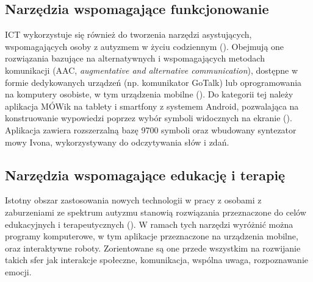     \subsection{Narzędzia wspomagające funkcjonowanie}
    ICT wykorzystuje się również do tworzenia narzędzi asystujących, wspomagających osoby z autyzmem w życiu codziennym (\cite{boucenna2014interactive}). %
    Obejmują one rozwiązania bazujące na alternatywnych i wspomagających metodach komunikacji (AAC, \emph{augmentative and alternative communication}), dostępne w formie dedykowanych urządzeń (np. komunikator GoTalk) lub oprogramowania na komputery osobiste, w tym urządzenia mobilne (\cite{shane2012applying}).
    Do kategorii tej należy aplikacja MÓWik na tablety i smartfony z systemem Android, pozwalająca na konstruowanie wypowiedzi poprzez wybór symboli widocznych na ekranie (\cite{markuc2014wspomaganie}).
    Aplikacja zawiera rozszerzalną bazę 9700 symboli oraz wbudowany syntezator mowy Ivona, wykorzystywany do odczytywania słów i zdań.
    
    \subsection{Narzędzia wspomagające edukację i terapię}
    Istotny obszar zastosowania nowych technologii w pracy z osobami z zaburzeniami ze spektrum autyzmu stanowią rozwiązania przeznaczone do celów edukacyjnych i terapeutycznych (\cite{boucenna2014interactive}).
    W ramach tych narzędzi wyróżnić można programy komputerowe, w tym aplikacje przeznaczone na urządzenia mobilne, oraz interaktywne roboty.
    Zorientowane są one przede wszystkim na rozwijanie takich sfer jak interakcje społeczne, komunikacja, wspólna uwaga, rozpoznawanie emocji.
    
